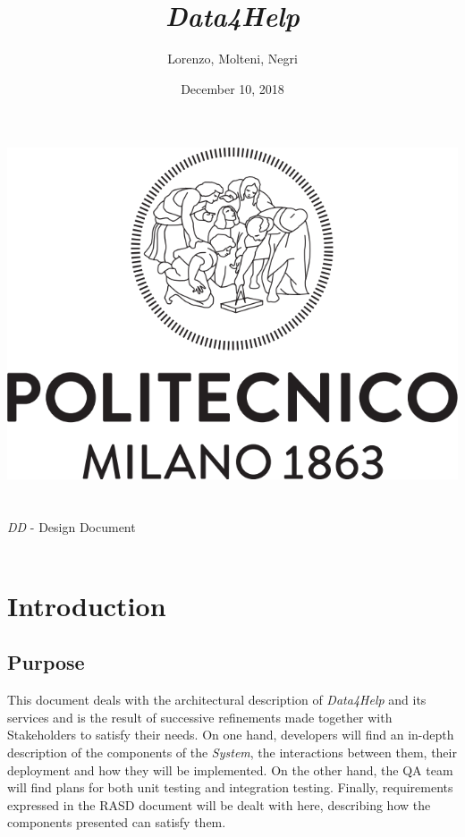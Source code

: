 \documentclass[titlepage]{article}
\title{{\Huge {\it {\it Data4Help}}}}
\author{Lorenzo, Molteni, Negri}
\date{December 10, 2018}
\begin{document}
	
	\makeatletter
	\begin{titlepage}
		\begin{center}
			\includegraphics[width=\linewidth]{logo.png}\\[20ex]
			{\huge  \@title }\\[2ex] 
			{\LARGE  \@author}\\[3ex] 
			{\LARGE {\it DD} - Design Document}\\[3ex]
			{\large \@date}\\[5ex]
		\end{center}
	\end{titlepage}
	\makeatother
	\thispagestyle{empty}
	\newpage
	
	\thispagestyle{empty}
	\newpage
	
	
	
	\pagebreak
	\tableofcontents{}
	\pagebreak
	
	\section{Introduction}
	\subsection{Purpose}
	This document deals with the architectural description of {\it Data4Help} and its services and is the result of successive refinements made together with Stakeholders to satisfy their needs.
	On one hand, developers will find an in-depth description of the components of the {\it System}, the interactions between them, their deployment and how they will be implemented.
	On the other hand, the QA team will find plans for both unit testing and integration testing.
	Finally, requirements expressed in the RASD document will be dealt with here, describing how the components presented can satisfy them.
	
\end{document}
